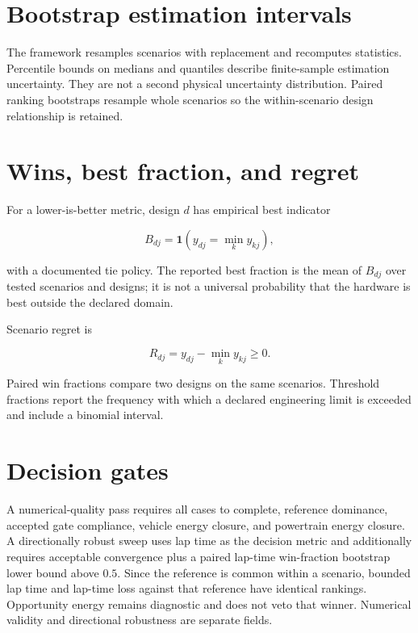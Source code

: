 \documentclass[11pt,oneside]{report}
\begin{document}
\section{Bootstrap estimation intervals}

The framework resamples scenarios with replacement and recomputes statistics.  Percentile
bounds on medians and quantiles describe finite-sample estimation uncertainty.  They are
not a second physical uncertainty distribution.  Paired ranking bootstraps resample
whole scenarios so the within-scenario design relationship is retained.

\section{Wins, best fraction, and regret}

For a lower-is-better metric, design $d$ has empirical best indicator

\begin{equation}
B_{dj}=\mathbf{1}\!\left(y_{dj}=\min_k y_{kj}\right),
\end{equation}

with a documented tie policy.  The reported best fraction is the mean of $B_{dj}$ over
tested scenarios and designs; it is not a universal probability that the hardware is
best outside the declared domain.

Scenario regret is

\begin{equation}
R_{dj}=y_{dj}-\min_k y_{kj}\geq 0.
\end{equation}

Paired win fractions compare two designs on the same scenarios.  Threshold fractions
report the frequency with which a declared engineering limit is exceeded and include a
binomial interval.

\section{Decision gates}

A numerical-quality pass requires all cases to complete, reference dominance, accepted
gate compliance, vehicle energy closure, and powertrain energy closure. A directionally
robust sweep uses lap time as the decision metric and additionally requires acceptable
convergence plus a paired lap-time win-fraction bootstrap lower bound above $0.5$. Since
the reference is common within a scenario, bounded lap time and lap-time loss against
that reference have identical rankings. Opportunity energy remains diagnostic and does
not veto that winner. Numerical validity and directional robustness are separate fields.
\end{document}
